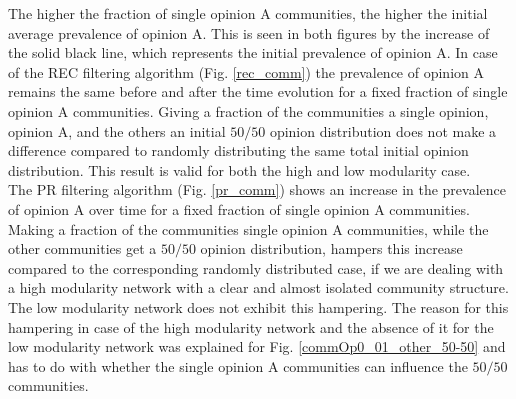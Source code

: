 \documentclass[11 pt , letterpaper , twoside , openright]{book}
\begin{document}
\newline
The higher the fraction of single opinion A communities, the higher the initial average prevalence of opinion A. This is seen in both figures by the increase of the solid black line, which represents the initial prevalence of opinion A. In case of the REC filtering algorithm (Fig. \ref{rec_comm}) the prevalence of opinion A remains the same before and after the time evolution for a fixed fraction of single opinion A communities. Giving a fraction of the communities a single opinion, opinion A, and the others an initial $50/50$ opinion distribution does not make a difference compared to randomly distributing the same total initial opinion distribution. This result is valid for both the high and low modularity case.\\
\newline
The PR filtering algorithm (Fig. \ref{pr_comm}) shows an increase in the prevalence of opinion A over time for a fixed fraction of single opinion A communities. Making a fraction of the communities single opinion A communities, while the other communities get a $50/50$ opinion distribution, hampers this increase compared to the corresponding randomly distributed case, if we are dealing with a high modularity network with a clear and almost isolated community structure. The low modularity network does not exhibit this hampering. The reason for this hampering in case of the high modularity network and the absence of it for the low modularity network was explained for Fig. \ref{commOp0_01_other_50-50} and has to do with whether the single opinion A communities can influence the $50/50$ communities. 
\end{document}
